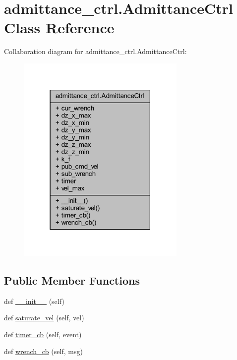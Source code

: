 \hypertarget{classadmittance__ctrl_1_1AdmittanceCtrl}{}\section{admittance\+\_\+ctrl.\+Admittance\+Ctrl Class Reference}
\label{classadmittance__ctrl_1_1AdmittanceCtrl}


Collaboration diagram for admittance\+\_\+ctrl.\+Admittance\+Ctrl\+:
\nopagebreak
\begin{figure}[H]
\begin{center}
\leavevmode
\includegraphics[width=231pt]{d2/d03/classadmittance__ctrl_1_1AdmittanceCtrl__coll__graph}
\end{center}
\end{figure}
\subsection*{Public Member Functions}
\begin{DoxyCompactItemize}
\item 
def \hyperlink{classadmittance__ctrl_1_1AdmittanceCtrl_a6e303b642da1e5fe2c9a3a29a148dbb9}{\+\_\+\+\_\+init\+\_\+\+\_\+} (self)
\item 
def \hyperlink{classadmittance__ctrl_1_1AdmittanceCtrl_a7191d1d7f805fbeef6a0a0667bd0ac65}{saturate\+\_\+vel} (self, vel)
\item 
def \hyperlink{classadmittance__ctrl_1_1AdmittanceCtrl_a38c53c8d924147104986363e8bd630f7}{timer\+\_\+cb} (self, event)
\item 
def \hyperlink{classadmittance__ctrl_1_1AdmittanceCtrl_a26b129bab2045988a9de094fbc7b582d}{wrench\+\_\+cb} (self, msg)
\end{DoxyCompactItemize}
